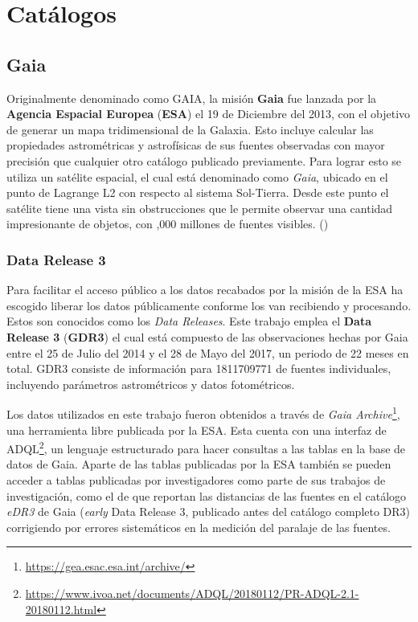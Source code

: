 \chapter{Catálogos}

\section{Gaia} \label{muestra:gaia}

Originalmente denominado como GAIA, la misión \textbf{Gaia} fue lanzada por
la \textbf{Agencia Espacial Europea} (\textbf{ESA}) el 19 de Diciembre del 2013, con el
objetivo de generar un mapa tridimensional de la Galaxia.
Esto incluye calcular las propiedades astrométricas y astrofísicas de sus
fuentes observadas con mayor precisión que cualquier otro catálogo publicado
previamente. Para lograr esto se utiliza un satélite espacial, el cual está
denominado como \textit{Gaia}, ubicado en el punto de Lagrange L2 con respecto al
sistema Sol-Tierra. Desde este punto el satélite tiene una vista sin obstrucciones
que le permite observar una cantidad impresionante de objetos, con ,000 millones de fuentes visibles. () 

\subsection{Data Release 3}

Para facilitar el acceso público a los datos recabados por la misión de \gaia la
ESA ha escogido liberar los datos públicamente conforme los van recibiendo y
procesando. Estos son conocidos como los \textit{Data Releases}. Este trabajo
emplea el \textbf{Data Release 3} (\textbf{GDR3}) el cual está compuesto de las
observaciones hechas por Gaia entre el 25 de Julio del 2014 y el 28 de Mayo del
2017, un periodo de 22 meses en total. GDR3 consiste de información para
\num{1811709771} de fuentes individuales, incluyendo parámetros astrométricos y
datos fotométricos. 

Los datos utilizados en este trabajo fueron obtenidos a través de
\textit{Gaia Archive}\footnote{\url{https://gea.esac.esa.int/archive/}}, una
herramienta libre publicada por la ESA. Esta cuenta con una interfaz de
ADQL\footnote{\url{https://www.ivoa.net/documents/ADQL/20180112/PR-ADQL-2.1-20180112.html}},
un lenguaje estructurado para hacer consultas a las tablas en la base de datos
de Gaia. Aparte de las tablas publicadas por la ESA también se pueden acceder a
tablas publicadas por investigadores como parte de sus trabajos de
investigación, como el de
 que reportan
las distancias de las fuentes en el catálogo \textit{eDR3} de Gaia
(\textit{early} Data Release 3, publicado antes del catálogo completo DR3)
corrigiendo por errores sistemáticos en la medición del paralaje de las fuentes.

